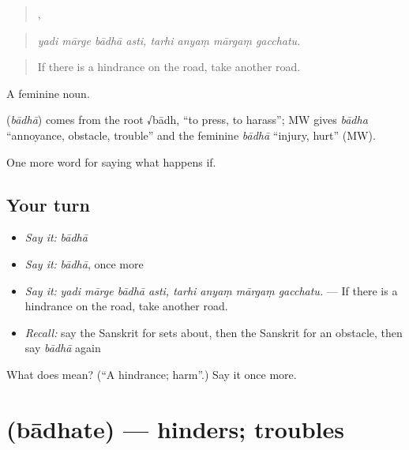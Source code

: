 \begin{quote}
   ,    
\end{quote}

\begin{quote}
\emph{yadi mārge bādhā asti, tarhi anyaṃ mārgaṃ gacchatu.}
\end{quote}

\begin{quote}
If there is a hindrance on the road, take another road.
\end{quote}

A feminine noun.

\begin{cousinweb}
\textbf{} (\emph{bādhā}) comes from the root √bādh, \textquotedblleft{}to press, to harass\textquotedblright{}; MW gives \emph{bādha} \textquotedblleft{}annoyance, obstacle, trouble\textquotedblright{} and the feminine \emph{bādhā} \textquotedblleft{}injury, hurt\textquotedblright{} (MW).
\end{cousinweb}

\begin{grammarlens}[title={What you've built}]
One more word for saying what happens if.
\end{grammarlens}

\subsection*{Your turn}
\begin{itemize}
\raggedright
  \item \emph{Say it:} \emph{bādhā}
  \item \emph{Say it:} \emph{bādhā}, once more
  \item \emph{Say it:} \emph{yadi mārge bādhā asti, tarhi anyaṃ mārgaṃ gacchatu.} — If there is a hindrance on the road, take another road.
  \item \emph{Recall:} say the Sanskrit for sets about, then the Sanskrit for an obstacle, then say \emph{bādhā} again
\end{itemize}

\begin{tcolorbox}[breakable,colback=teal!4,colframe=teal!35!black,title={Before you move on}]
What does  mean? (\textquotedblleft{}A hindrance; harm\textquotedblright{}.) Say it once more.
\end{tcolorbox}
\section[\texorpdfstring{\sk{बाधते} (bādhate)}{बाधते (bādhate)}]{ (bādhate) — hinders; troubles}

